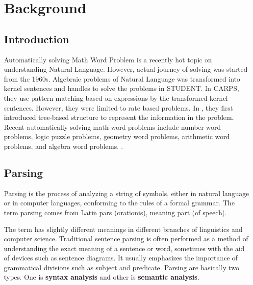 \documentclass[document.tex]{subfiles}
\begin{document}
\chapter{Background}
\section{Introduction}
\noindent Automatically solving Math Word Problem is a recently hot topic on understanding Natural Language. However, actual journey of solving was started from the 1960s. Algebraic problems of Natural Language was transformed into kernel sentences and handles to solve the problems in STUDENT\cite{4}. In CARPS\cite{5}, they use pattern matching based on expressions by the transformed kernel sentences. However, they were limited to rate based problems. In \cite{6}, they first introduced tree-based structure to represent the information in the problem. Recent automatically solving math word problems include number word problems\cite{7}, logic puzzle problems\cite{8}, geometry word problems\cite{9,10}, arithmetic word problems\cite{1}, \cite{11} and algebra word problems\cite{2,3}, \cite{12}.
\section{Parsing}
Parsing is the process of analyzing a string of symbols, either in natural language or in computer languages, conforming to the rules of a formal grammar. The term parsing comes from Latin pars (orationis), meaning part (of speech).

The term has slightly different meanings in different branches of linguistics and computer science. Traditional sentence parsing is often performed as a method of understanding the exact meaning of a sentence or word, sometimes with the aid of devices such as sentence diagrams. It usually emphasizes the importance of grammatical divisions such as subject and predicate.
Parsing are basically two types. One is \textbf{syntax analysis} and other is \textbf{semantic analysis}.
\end{document}
